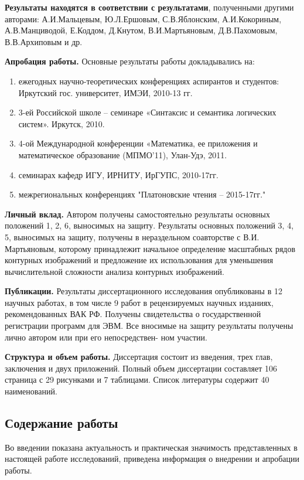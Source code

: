 \textbf{Результаты находятся в соответствии с результатами}, полученными другими авторами: А.И.Мальцевым,  Ю.Л.Ершовым, С.В.Яблонским,  А.И.Кокориным, А.В.Манциводой,  Е.Коддом, Д.Кнутом, В.И.Мартьяновым, Д.В.Пахомовым, В.В.Архиповым и др.

\textbf{Апробация работы.} Основные результаты работы докладывались на: 

\begin{enumerate}
\item ежегодных научно-теоретических конференциях аспирантов и студентов:  Иркутский  гос. университет, ИМЭИ, 2010-13 гг.
\item 3-ей Российской школе – семинаре «Синтаксис и семантика логических систем». Иркутск, 2010.
\item 4-ой Международной конференции «Математика, ее приложения и математическое образование (МПМО’11),  Улан-Удэ, 2011.
\item семинарах кафедр ИГУ, ИРНИТУ, ИрГУПС, 2010-17гг.
\item межрегиональных конференциях "Платоновские чтения – 2015-17гг."
\end{enumerate}


\textbf{Личный вклад.} Автором получены самостоятельно результаты основных положений 1, 2, 6,  выносимых  на защиту.  Результаты основных положений 3, 4, 5,  выносимых  на защиту, получены в нераздельном соавторстве с В.И. Мартьяновым, которому принадлежит начальное определение масштабных рядов контурных изображений и предложение их использования для уменьшения вычислительной сложности анализа контурных изображений.

\textbf{Публикации.} Результаты диссертационного исследования
опубликованы в 12 научных работах, в том числе 9 работ в рецензируемых научных изданиях, рекомендованных ВАК РФ. Получены свидетельства о государственной регистрации программ для ЭВМ.
Все вносимые на защиту результаты получены лично автором или при его непосредствен-
ном участии.

\textbf{Структура и объем работы.} Диссертация состоит из введения, трех глав, заключения и двух приложений. Полный объем диссертации составляет 106 страница с 29 рисунками и 7 таблицами. Список литературы содержит 40 наименований.

\subsection*{\Large Содержание работы}
Во введении показана актуальность и практическая значимость представленных в настоящей работе исследований, приведена информация о внедрении и апробации работы.

